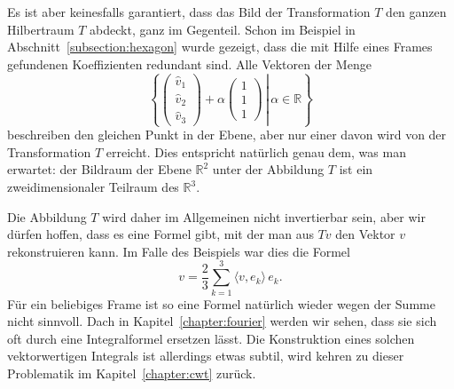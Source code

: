 Es ist aber keinesfalls garantiert, dass das Bild der Transformation $T$
den ganzen Hilbertraum $T$ abdeckt, ganz im Gegenteil.
Schon im Beispiel in Abschnitt~\ref{subsection:hexagon} wurde gezeigt,
dass die mit Hilfe eines Frames gefundenen Koeffizienten redundant sind.
Alle Vektoren der Menge
\[
\left\{
\left.
\begin{pmatrix}\hat{v}_1\\\hat{v}_2\\\hat{v}_3\end{pmatrix}
+\alpha\begin{pmatrix}1\\1\\1\end{pmatrix}
\,
\right|\,
\alpha \in\mathbb R
\right\}
\]
beschreiben den gleichen Punkt in der Ebene, aber nur einer davon 
wird von der Transformation $T$ erreicht.
Dies entspricht natürlich genau dem, was man erwartet: der Bildraum
der Ebene $\mathbb R^2$ unter der Abbildung $T$ ist ein zweidimensionaler
Teilraum des $\mathbb R^3$.

Die Abbildung $T$ wird daher im Allgemeinen nicht invertierbar sein, aber
wir dürfen hoffen, dass es eine Formel gibt, mit der man aus $Tv$ den 
Vektor $v$ rekonstruieren kann.
Im Falle des Beispiels war dies die Formel
\[
v = \frac23 \sum_{k=1}^3 \langle v,e_k\rangle \, e_k.
\]
Für ein beliebiges Frame ist so eine Formel natürlich wieder wegen
der Summe nicht sinnvoll.
Dach in Kapitel~\ref{chapter:fourier} werden wir sehen, dass sie sich
oft durch eine Integralformel ersetzen lässt.
Die Konstruktion eines solchen vektorwertigen Integrals ist allerdings
etwas subtil, wird kehren zu dieser Problematik im Kapitel~\ref{chapter:cwt}
zurück.


